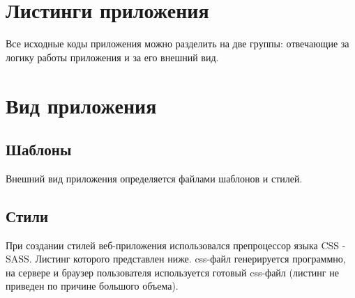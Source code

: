 \section{Листинги приложения}

Все исходные коды приложения можно разделить на две группы: отвечающие за логику работы приложения и за его внешний вид.


\section{Вид приложения}
\subsection{Шаблоны}

Внешний вид приложения определяется файлами шаблонов и стилей.


\subsection{Стили}

При создании стилей веб-приложения использовался препроцессор языка CSS - SASS. Листинг которого представлен ниже. css-файл генерируется программно, на сервере и браузер пользователя используется готовый css-файл (листинг не приведен по причине большого объема).

